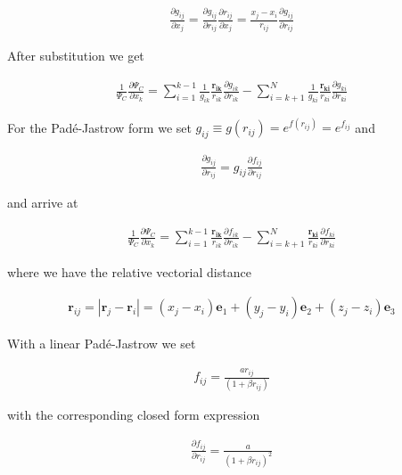 \documentclass[11pt]{article}
\begin{document}
			\begin{align}
				\frac{\partial g_{ij}}{\partial x_{j}}=\frac{\partial g_{ij}}{\partial r_{ij}}\frac{\partial r_{ij}}{\partial x_{j}}=\frac{x_{j}-x_{i}}{r_{ij}}\frac{\partial g_{ij}}{\partial r_{ij}}
			\end{align}

			After substitution we get

			\begin{align}
				\frac{1}{\Psi_{C}}\frac{\partial\Psi_{C}}{\partial x_{k}}=\sum_{i=1}^{k-1}\frac{1}{g_{ik}}\frac{\mathbf{r_{ik}}}{r_{ik}}\frac{\partial g_{ik}}{\partial r_{ik}}-\sum_{i=k+1}^{N}\frac{1}{g_{ki}}\frac{\mathbf{r_{ki}}}{r_{ki}}\frac{\partial g_{ki}}{\partial r_{ki}}
			\end{align}

			For the Padé-Jastrow form we set $\ensuremath{g_{ij}\equiv g(r_{ij})=e^{f(r_{ij})}=e^{f_{ij}}}$
			and

			\begin{align}
				\frac{\partial g_{ij}}{\partial r_{ij}}=g_{ij}\frac{\partial f_{ij}}{\partial r_{ij}}
			\end{align}

			and arrive at

			\begin{align}
				\frac{1}{\Psi_{C}}\frac{\partial\Psi_{C}}{\partial x_{k}}=\sum_{i=1}^{k-1}\frac{\mathbf{r_{ik}}}{r_{ik}}\frac{\partial f_{ik}}{\partial r_{ik}}-\sum_{i=k+1}^{N}\frac{\mathbf{r_{ki}}}{r_{ki}}\frac{\partial f_{ki}}{\partial r_{ki}} \label{eq:gradient_ratio_Jastrow}
			\end{align}

			where we have the relative vectorial distance

			\begin{align}
				\mathbf{r}_{ij}=|\mathbf{r}_{j}-\mathbf{r}_{i}|=(x_{j}-x_{i})\mathbf{e}_{1}+(y_{j}-y_{i})\mathbf{e}_{2}+(z_{j}-z_{i})\mathbf{e}_{3}
			\end{align}

			With a linear Padé-Jastrow we set

			\begin{align}
				f_{ij}=\frac{ar_{ij}}{(1+\beta r_{ij})}
			\end{align}

			with the corresponding closed form expression

			\begin{align}
				\frac{\partial f_{ij}}{\partial r_{ij}}=\frac{a}{(1+\beta r_{ij})^{2}}
			\end{align}
\end{document}
